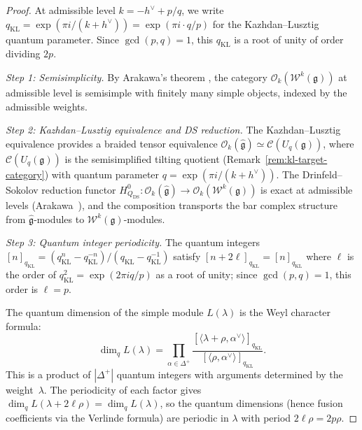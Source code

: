 \begin{proof}
At admissible level $k = -h^\vee + p/q$, we write $q_{\mathrm{KL}} = \exp(\pi i/(k + h^\vee)) = \exp(\pi i \cdot q/p)$ for the Kazhdan--Lusztig quantum parameter.  Since $\gcd(p,q) = 1$, this $q_{\mathrm{KL}}$ is a root of unity of order dividing $2p$.

\emph{Step 1: Semisimplicity.}
By Arakawa's theorem \cite{Ara07}, the category $\mathcal{O}_k(\mathcal{W}^k(\mathfrak{g}))$ at admissible level is semisimple with finitely many simple objects, indexed by the admissible weights.

\emph{Step 2: Kazhdan--Lusztig equivalence and DS reduction.}
The Kazhdan--Lusztig equivalence \cite{KL93} provides a braided tensor equivalence $\mathcal{O}_k(\widehat{\mathfrak{g}}) \simeq \mathcal{C}(U_q(\mathfrak{g}))$, where $\mathcal{C}(U_q(\mathfrak{g}))$ is the semisimplified tilting quotient (Remark~\ref{rem:kl-target-category}) with quantum parameter $q = \exp(\pi i/(k + h^\vee))$.  The Drinfeld--Sokolov reduction functor $H^0_{Q_{\mathrm{DS}}} \colon \mathcal{O}_k(\widehat{\mathfrak{g}}) \to \mathcal{O}_k(\mathcal{W}^k(\mathfrak{g}))$ is exact at admissible levels (Arakawa~\cite{Ara07}), and the composition transports the bar complex structure from $\widehat{\mathfrak{g}}$-modules to $\mathcal{W}^k(\mathfrak{g})$-modules.

\emph{Step 3: Quantum integer periodicity.}
The quantum integers $[n]_{q_{\mathrm{KL}}} = (q_{\mathrm{KL}}^n - q_{\mathrm{KL}}^{-n})/(q_{\mathrm{KL}} - q_{\mathrm{KL}}^{-1})$ satisfy $[n + 2\ell]_{q_{\mathrm{KL}}} = [n]_{q_{\mathrm{KL}}}$ where $\ell$ is the order of $q_{\mathrm{KL}}^2 = \exp(2\pi i q/p)$ as a root of unity; since $\gcd(p,q) = 1$, this order is $\ell = p$.

The quantum dimension of the simple module $L(\lambda)$ is the Weyl character formula:
\[
\dim_q L(\lambda) = \prod_{\alpha \in \Delta^+}
\frac{[\langle \lambda + \rho, \alpha^\vee \rangle]_{q_{\mathrm{KL}}}}
     {[\langle \rho, \alpha^\vee \rangle]_{q_{\mathrm{KL}}}}.
\]
This is a product of $|\Delta^+|$ quantum integers with arguments determined by the weight~$\lambda$.  The periodicity of each factor gives $\dim_q L(\lambda + 2\ell\rho) = \dim_q L(\lambda)$, so the quantum dimensions (hence fusion coefficients via the Verlinde formula) are periodic in $\lambda$ with period $2\ell\rho = 2p\rho$.


\end{proof}
